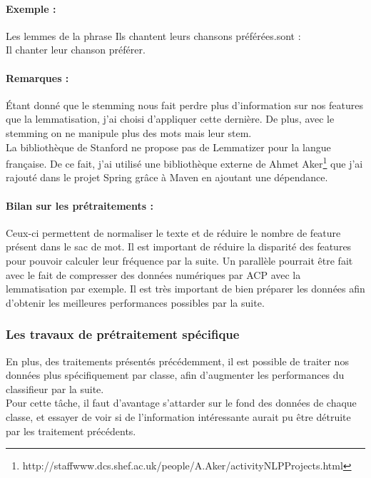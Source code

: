                 \paragraph{Exemple :}
                    Les lemmes de la phrase \og Ils chantent leurs chansons préférées.\fg sont :\\
                     \og Il chanter leur chanson préférer. \fg

                \paragraph{Remarques :}
                    Étant donné que le stemming nous fait perdre plus d'information sur nos features que la lemmatisation, j'ai choisi d'appliquer cette dernière. De plus, avec le stemming on ne manipule plus des mots mais leur stem.\\
                    La bibliothèque de Stanford ne propose pas de Lemmatizer pour la langue française. De ce fait, j'ai utilisé une bibliothèque externe de Ahmet Aker\footnote{http://staffwww.dcs.shef.ac.uk/people/A.Aker/activityNLPProjects.html} que j'ai rajouté dans le projet Spring grâce à Maven en ajoutant une dépendance.

                \paragraph{Bilan sur les prétraitements :}
                    Ceux-ci permettent de normaliser le texte et de réduire le nombre de feature présent dans le sac de mot. Il est important de réduire la disparité des features pour pouvoir calculer leur fréquence par la suite. Un parallèle pourrait être fait avec le fait de compresser des données numériques par ACP avec la lemmatisation par exemple. Il est très important de bien préparer les données afin d'obtenir les meilleures performances possibles par la suite.

            \subsubsection{Les travaux de prétraitement spécifique}
                En plus, des traitements présentés précédemment, il est possible de traiter nos données plus spécifiquement par classe, afin d'augmenter les performances du classifieur par la suite.\\
                Pour cette tâche, il faut d'avantage s'attarder sur le fond des données de chaque classe, et essayer de voir si de l'information intéressante aurait pu être détruite par les traitement précédents.

